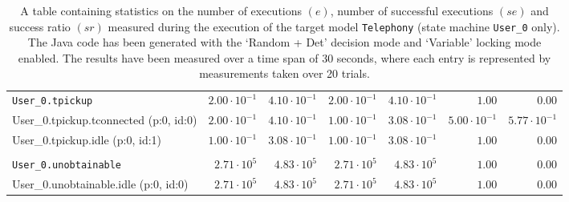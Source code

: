 \begin{table}[htbp]
{\begin{tabular}{lrrrrrr}
\\[-8pt]\texttt{User\_0.tpickup}                      & $2.00 \cdot 10^{-1}$ & $4.10 \cdot 10^{-1}$ & $2.00 \cdot 10^{-1}$ & $4.10 \cdot 10^{-1}$ &               $1.00$ &               $0.00$ \\
\hspace{3mm}User\_0.tpickup.tconnected (p:0, id:0)    & $2.00 \cdot 10^{-1}$ & $4.10 \cdot 10^{-1}$ & $1.00 \cdot 10^{-1}$ & $3.08 \cdot 10^{-1}$ & $5.00 \cdot 10^{-1}$ & $5.77 \cdot 10^{-1}$ \\
\hspace{3mm}User\_0.tpickup.idle (p:0, id:1)          & $1.00 \cdot 10^{-1}$ & $3.08 \cdot 10^{-1}$ & $1.00 \cdot 10^{-1}$ & $3.08 \cdot 10^{-1}$ &               $1.00$ &               $0.00$ \\
\\[-8pt]\texttt{User\_0.unobtainable}                 &  $2.71 \cdot 10^{5}$ &  $4.83 \cdot 10^{5}$ &  $2.71 \cdot 10^{5}$ &  $4.83 \cdot 10^{5}$ &               $1.00$ &               $0.00$ \\
\hspace{3mm}User\_0.unobtainable.idle (p:0, id:0)     &  $2.71 \cdot 10^{5}$ &  $4.83 \cdot 10^{5}$ &  $2.71 \cdot 10^{5}$ &  $4.83 \cdot 10^{5}$ &               $1.00$ &               $0.00$ \\
\bottomrule
\end{tabular}
}
\caption{A table containing statistics on the number of executions $(e)$, number of successful executions $(se)$ and success ratio $(sr)$ measured during the execution of the target model \texttt{Telephony} (state machine \texttt{User\_0} only). The Java code has been generated with the `Random + Det' decision mode and `Variable' locking mode enabled. The results have been measured over a time span of 30 seconds, where each entry is represented by measurements taken over 20 trials.}
\label{table:frequency_results_telephony_random_det_variable_user_0}
\end{table}